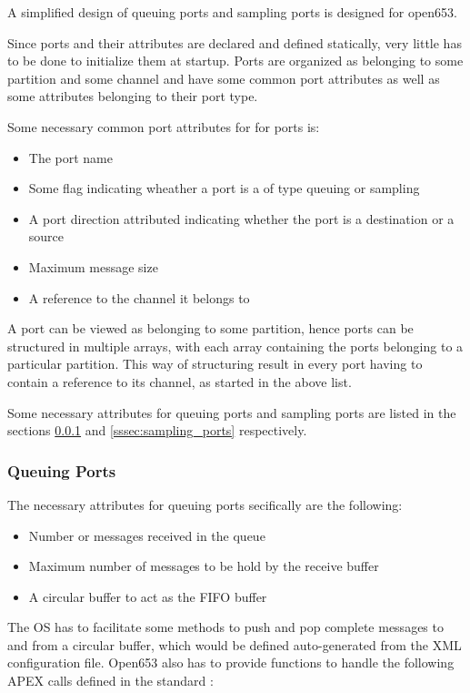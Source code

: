 A simplified design of queuing ports and sampling ports is designed for open653.

Since ports and their attributes are declared and defined statically,
very little has to be done to initialize them at startup.
Ports are organized as belonging to some partition and some channel
and have some common port attributes as well as some attributes belonging to their port type.

Some necessary common port attributes for for ports is:
\begin{itemize}
	\item The port name
	\item Some flag indicating wheather a port is a of type queuing or sampling
	\item A port direction attributed indicating whether the port is a destination or a source
	\item Maximum message size
	\item A reference to the channel it belongs to
\end{itemize}

A port can be viewed as belonging to some partition,
hence ports can be structured in multiple arrays,
with each array containing the ports belonging to a particular partition.
This way of structuring result in every port having to contain a reference to its channel, as started in the above list.

Some necessary attributes for queuing ports and sampling ports are listed in
the sections \ref{sssec:queuing_ports} and \ref{sssec:sampling_ports} respectively.

\subsubsection{Queuing Ports}
\label{sssec:queuing_ports}
The necessary attributes for queuing ports secifically are the following:
\begin{itemize}
	\item Number or messages received in the queue
	\item Maximum number of messages to be hold by the receive buffer
	\item A circular buffer to act as the FIFO buffer
\end{itemize}

The OS has to facilitate some methods to push and pop complete messages to and from a circular buffer,
which would be defined auto-generated from the XML configuration file.
Open653 also has to provide functions to handle the following APEX calls defined in the standard \cite{arinc_interpartition_comm}:


